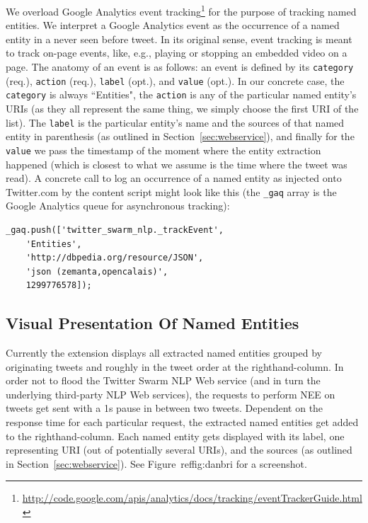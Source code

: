 \documentclass[runningheads,a4paper]{llncs}
\begin{document}
We overload Google Analytics event tracking\footnote{\url{http://code.google.com/apis/analytics/docs/tracking/eventTrackerGuide.html}} for the purpose of tracking named entities. We interpret a Google Analytics event as the occurrence of a named entity in a never seen before tweet. In its original sense, event tracking is meant to track on-page events, like, e.g., playing or stopping an embedded video on a page. The anatomy of an event is as follows: an event is defined by its \texttt{category} (req.), \texttt{action} (req.), \texttt{label} (opt.), and \texttt{value} (opt.). In our concrete case, the \texttt{category} is always ``Entities", the \texttt{action} is any of the particular named entity's URIs (as they all represent the same thing, we simply choose the first URI of the list). The \texttt{label} is the particular entity's name and the sources of that named entity in parenthesis (as outlined in Section~\ref{sec:webservice}), and finally for the \texttt{value} we pass the timestamp of the moment where the entity extraction happened (which is closest to what we assume is the time where the tweet was read). A concrete call to log an occurrence of a named entity as injected onto Twitter.com by the content script might look like this (the \texttt{\_gaq} array is the Google Analytics queue for asynchronous tracking):

\begin{lstlisting}
_gaq.push(['twitter_swarm_nlp._trackEvent',
    'Entities',
    'http://dbpedia.org/resource/JSON',
    'json (zemanta,opencalais)',
    1299776578]);
\end{lstlisting}

\subsection{Visual Presentation Of Named Entities}
Currently the extension displays all extracted named entities grouped by originating tweets and roughly in the tweet order at the righthand-column. In order not to flood the Twitter Swarm NLP Web service (and in turn the underlying third-party NLP Web services), the requests to perform NEE on tweets get sent with a 1s pause in between two tweets. Dependent on the response time for each particular request, the extracted named entities get added to the righthand-column. Each named entity gets displayed with its label, one representing URI (out of potentially several URIs), and the sources (as outlined in Section~\ref{sec:webservice}). See Figure~ref{fig:danbri} for a screenshot.
\end{document}
